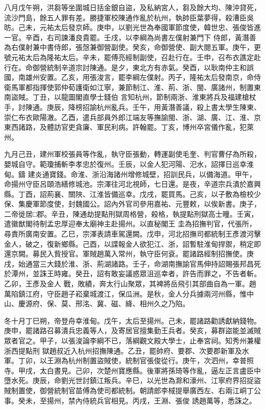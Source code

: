 \begin{pinyinscope}
 八月戊午朔，洪芻等坐圍城日括金銀自盜，及私納宮人，芻及餘大均、陳沖貸死，流沙門島，餘五人罪有差。勝捷軍校陳通作亂於杭州，執帥臣葉夢得，殺漕臣吳昉。己未，元祐太后發京師。庚申，以劉光世為奉國軍節度使，韓世忠、張俊皆進一官。辛酉，右司諫潘良貴罷。壬戌，以李綱為尚書左僕射兼門下
 侍郎，黃潛善為右僕射兼中書侍郎，張愨兼御營副使。癸亥，命御營使、副大閱五軍。庚午，更號元祐太后為隆祐太后。辛未，罷傅亮經制副使，召赴行在。壬申，召布衣譙定赴行在。命御營統制辛道宗討陳通。是夕，東北方有赤氣。癸酉，以耿南仲主和誤國，南雄州安置。乙亥，用張浚言，罷李綱左僕射。丙子，隆祐太后發南京，命侍衛馬軍都指揮使郭仲荀護衛如江寧，兼節制江、淮、荊、浙、閩、廣諸州，制置東南盜賊。丁丑，以龍圖閣直學士錢伯
 言知杭州，節制兩浙、淮東將兵及福建槍杖手，討陳通。庚辰，降榜招諭杭州亂兵。壬午，用黃潛善議，殺上書太學生陳東、崇仁布衣歐陽澈。乙酉，遣兵部員外郎江端友等撫諭閩、浙、湖、廣、江、淮、京東西諸路，及體訪官吏貪廉、軍民利病。許翰罷。丁亥，博州卒宮儀作亂，犯萊州。



 九月己丑，建州軍校張員等作亂，執守臣張動，轉運副使毛奎、判官曹仔為所殺，嬰城自守。範瓊捕斬李孝忠於復州。壬辰，以金人犯河陽、汜水，詔擇日巡幸淮甸。鑄
 建炎通寶錢。命淮、浙沿海諸州增修城壁，招訓民兵，以備海道。甲午，命揚州守臣呂頤浩繕修城池。宗澤往河北視師，七日還。是夜，辛道宗兵潰於嘉興縣。丁酉，詔荊襄、關陜、江淮皆備巡幸。戊戌，罷買馬。己亥，以子敷為檢校少保、集慶軍節度使，封魏國公。詔內外官司參用嘉祐、元豐敕，以俟新書。庚子，二帝徙居□郡。辛丑，陳通劫提點刑獄周格營，殺格，執提點刑獄高士曈。壬寅，遣徽猷閣待制孟忠厚迎奉太廟神主赴揚州。以直秘閣王
 圭為招撫判官，代張所，尋責所廣南安置。乙巳，宗澤表請車駕還闕。戊申，河北招撫司都統制王彥渡河擊金人，破之，復新鄉縣。己酉，以諜報金人欲犯江、浙，詔暫駐淮甸捍禦，稍定即還京闕。募民入貲授官。軍賊趙萬入常州，執守臣何袞。罷諸路經制招撫使。庚戌，始通當三大錢於淮、浙、荊湖諸路。壬子，命湖南撫諭官馬伸持詔賜張邦昌死於潭州，並誅王時雍。癸丑，詔有敢妄議惑眾沮巡幸者，許告而罪之，不告者斬。乙卯，王彥及金人
 戰，敗績，奔太行山聚眾，其裨將岳飛引其部曲自為一軍。趙萬陷鎮江府，守臣趙子崧棄城渡江，保瓜洲。是秋，金人分兵據兩河州縣，惟中山、慶源府、保、莫、邢洺、冀、磁、絳、相州久之乃陷。



 冬十月丁巳朔，帝登舟幸淮甸。戊午，太后至揚州。己未，罷諸路勸誘獻納錢物。庚申，罷諸路召募潰兵忠義等人，及寄居官擅集勤王兵者。癸亥，募群盜能並滅賊眾者官之。甲子，以張浚論李綱不已，落綱觀文殿大學士，止奉宮祠。知秀州兼權浙西提點刑
 獄趙叔近入杭州招撫陳通。乙丑，罷帥府、要郡、次要郡新軍及水軍。丁卯，以王淵為杭州制置盜賊使，統制官張俊從行。庚午，次泗州，幸普照寺。甲戌，太白晝見。己卯，次楚州寶應縣。後軍將孫琦等作亂，逼左正言盧臣中墮水死。庚辰，命劉光世討鎮江叛兵。辛巳，以光世為滁和濠州、江寧府界招捉盜賊制置使，御營統制官苗傅為使司都統制。朝請郎李棫提舉廣西左、右兩江峒丁公事。癸未，至揚州，禁內侍統兵官相見。丙戌，王淵、張俊
 誘趙萬等，悉誅之。




\end{pinyinscope}
